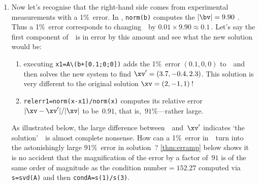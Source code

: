 \begin{example}
\begin{enumerate}
\item Now let's recognise that the right-hand side comes from experimental measurements with a 1\%~error.
In \script, \verb|norm(b)| computes the  \(|\bv|=9.90\) \twodp.
Thus a 1\%~error corresponds to changing~\bv\ by \(0.01\times 9.90\approx 0.1\)\,.
Let's say the first component of~\bv\ is in error by this amount and see what the new solution would be:
\setbox\ajrqrbox\hbox{}%
\marginpar{\usebox{\ajrqrbox\\[2ex]}}%
\begin{enumerate}
\item executing \verb|x1=A\(b+[0.1;0;0])| adds the  1\%~error \((0.1,0,0)\) to~\bv\ and then solves the new system to find \(\xv'=(3.7,-0.4,2.3)\).
This solution is very different to the original solution \(\xv=(2,-1,1)\)\,!
\item \verb|relerr1=norm(x-x1)/norm(x)| computes its relative error \(|\xv-\xv'|/|\xv|\) to be~\(0.91\), that is,~\(91\%\)---rather large.
\end{enumerate}
As illustrated below, the large difference between~\xv\ and~\(\xv'\) indicates `the solution'~\xv\ is almost complete nonsense.
How can a 1\%~error in~\bv\ turn into the astonishingly large 91\%~error in solution~\xv?  
\autoref{thm:erramp} below shows it is no accident that the magnification of the error by a factor of~\(91\) is of the same order of magnitude as the condition number\({}=152.27\) computed via \verb|s=svd(A)| and then \verb|condA=s(1)/s(3)|.
\begin{center}
\end{center}



\end{enumerate}
\end{example}
